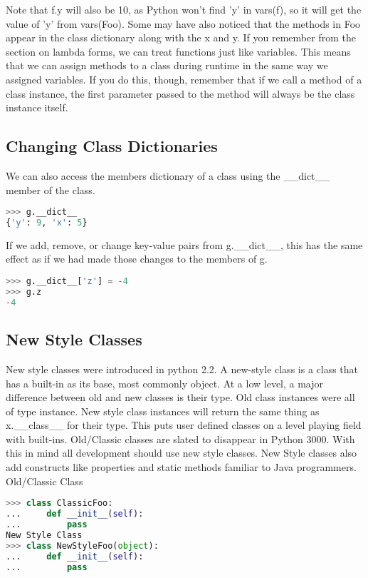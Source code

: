 Note that f.y will also be 10, as Python won't find 'y' in vars(f), so it will
get the value of 'y' from vars(Foo).  Some may have also noticed that the
methods in Foo appear in the class dictionary along with the x and y. If you
remember from the section on lambda forms, we can treat functions just like
variables. This means that we can assign methods to a class during runtime in
the same way we assigned variables. If you do this, though, remember that if we
call a method of a class instance, the first parameter passed to the method will
always be the class instance itself.

\subsection{Changing Class Dictionaries}
We can also access the members dictionary of a class using the \_\_dict\_\_
member of the class.
\lstset{basicstyle=\scriptsize, numbers=left, captionpos=b, tabsize=4}
\begin{lstlisting}[caption=Changing Class Dicts,language={Python},
xleftmargin=15pt, label=lst:changingclassdicts]
>>> g.__dict__
{'y': 9, 'x': 5}
\end{lstlisting}

If we add, remove, or change key-value pairs from g.\_\_dict\_\_, this has the same
effect as if we had made those changes to the members of g.
\lstset{basicstyle=\scriptsize, numbers=left, captionpos=b, tabsize=4}
\begin{lstlisting}[caption=Remove class Member,language={Python},
xleftmargin=15pt, label=lst:removeclassmember]
>>> g.__dict__['z'] = -4
>>> g.z
-4
\end{lstlisting}

\subsection{New Style Classes}
New style classes were introduced in python 2.2. A new-style class is a class
that has a built-in as its base, most commonly object. At a low level, a major
difference between old and new classes is their type. Old class instances were
all of type instance. New style class instances will return the same thing as
x.\_\_class\_\_ for their type. This puts user defined classes on a level playing
field with built-ins. Old/Classic classes are slated to disappear in Python
3000. With this in mind all development should use new style classes. New Style
classes also add constructs like properties and static methods familiar to Java
programmers.
Old/Classic Class
\lstset{basicstyle=\scriptsize, numbers=left, captionpos=b, tabsize=4}
\begin{lstlisting}[caption=New Style Classes,language={Python},
xleftmargin=15pt, label=lst:newstyleclasses]
>>> class ClassicFoo:
...     def __init__(self):
...         pass
New Style Class
>>> class NewStyleFoo(object):
...     def __init__(self):
...         pass
\end{lstlisting}

